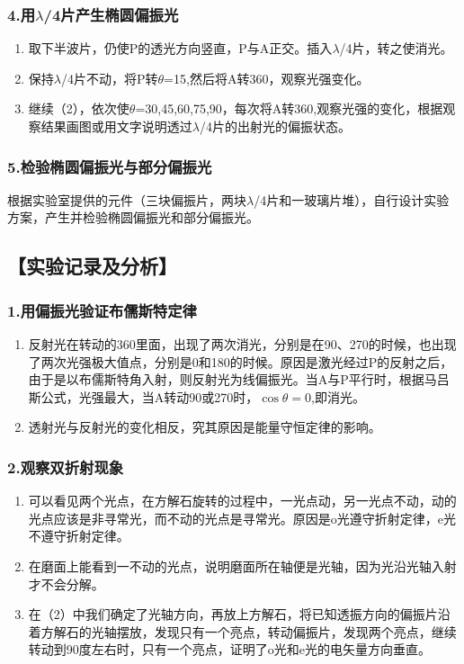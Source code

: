 \documentclass[12pt,a4paper,UTF8]{ctexart}
\begin{document}
	\subsubsection*{4.用$\lambda$/4片产生椭圆偏振光}
	\begin{enumerate}[(1)]
			\item 取下半波片，仍使P的透光方向竖直，P与A正交。插入$\lambda$/4片，转之使消光。
			\item 保持$\lambda$/4片不动，将P转$\theta$=15\degree,然后将A转360\degree，观察光强变化。
			\item 继续（2），依次使$\theta$=30\degree,45\degree,60\degree,75\degree,90\degree，每次将A转360\degree,观察光强的变化，根据观察结果画图或用文字说明透过$\lambda$/4片的出射光的偏振状态。
	\end{enumerate}
	\subsubsection*{5.检验椭圆偏振光与部分偏振光}
	根据实验室提供的元件（三块偏振片，两块$\lambda$/4片和一玻璃片堆），自行设计实验方案，产生并检验椭圆偏振光和部分偏振光。

\subsection*{【实验记录及分析】}
	\subsubsection*{1.用偏振光验证布儒斯特定律}
	\begin{enumerate}[(1)]
		\item 反射光在转动的360\degree 里面，出现了两次消光，分别是在90\degree、270\degree 的时候，也出现了两次光强极大值点，分别是0\degree 和180\degree 的时候。原因是激光经过P的反射之后，由于是以布儒斯特角入射，则反射光为线偏振光。当A与P平行时，根据马吕斯公式，光强最大，当A转动90\degree 或270\degree 时，$\cos\theta=0 $,即消光。
		\item 透射光与反射光的变化相反，究其原因是能量守恒定律的影响。
	\end{enumerate}

	\subsubsection*{2.观察双折射现象}
	\begin{enumerate}[(1)]
		\item 可以看见两个光点，在方解石旋转的过程中，一光点动，另一光点不动，动的光点应该是非寻常光，而不动的光点是寻常光。原因是o光遵守折射定律，e光不遵守折射定律。
		\item 在磨面上能看到一不动的光点，说明磨面所在轴便是光轴，因为光沿光轴入射才不会分解。
		\item 在（2）中我们确定了光轴方向，再放上方解石\uppercase\expandafter{}，将已知透振方向的偏振片沿着方解石的光轴摆放，发现只有一个亮点，转动偏振片，发现两个亮点，继续转动到90度左右时，只有一个亮点，证明了o光和e光的电矢量方向垂直。
	\end{enumerate}
\end{document}
